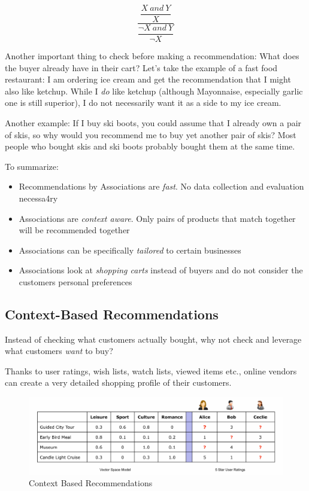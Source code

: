 \documentclass[11pt]{article}
\begin{document}
\begin{equation}
    \dfrac{\dfrac{X\ and\ Y}{X}}{\dfrac{¬X\ and\ Y}{¬X}}
\end{equation}

\vspace{10px}

Another important thing to check before making a recommendation: What does the buyer already have in their cart? Let's take the example of a fast food restaurant: I am ordering ice cream and get the recommendation that I might also like ketchup. While I \textit{do} like ketchup (although Mayonnaise, especially garlic one is still superior), I do not necessarily want it as a side to my ice cream.

Another example: If I buy ski boots, you could assume that I already own a pair of skis, so why would you recommend me to buy yet another pair of skis? Most people who bought skis and ski boots probably bought them at the same time.

\vspace{10px}

To summarize:

\begin{itemize}
    \item Recommendations by Associations are \textit{fast}. No data collection and evaluation necessa4ry
    \item Associations are \textit{context aware}. Only pairs of products that match together will be recommended together
    \item Associations can be specifically \textit{tailored} to certain businesses
    \item Associations look at \textit{shopping carts} instead of buyers and do not consider the customers personal preferences
\end{itemize}

\subsection{Context-Based Recommendations}

Instead of checking what customers actually bought, why not check and leverage what customers \textit{want} to buy?

Thanks to user ratings, wish lists, watch lists, viewed items etc., online vendors can create a very detailed shopping profile of their customers.

\begin{figure}[htb!]
    \centering
    \includegraphics[keepaspectratio=true, width=\linewidth]{context_based_recommendations.png}
    \caption{Context Based Recommendations}
    \label{fig:context_based_recommendations}
\end{figure}
\end{document}
